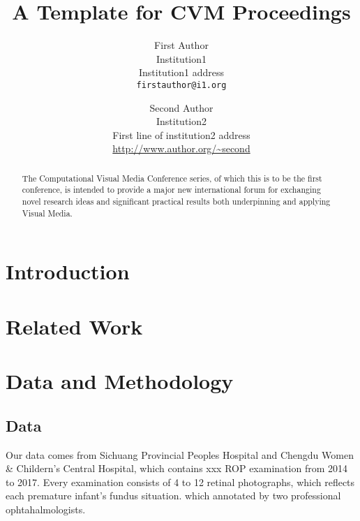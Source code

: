 \documentclass[10pt,twocolumn,letterpaper]{article}
\begin{document}
\title{A Template for CVM Proceedings}

\author{First Author\\
Institution1\\
Institution1 address\\
{\tt\small firstauthor@i1.org}
\and
Second Author\\
Institution2\\
First line of institution2 address\\
{\small\url{http://www.author.org/~second}}
}

\maketitle

\begin{abstract}
    The Computational Visual Media Conference series, of which this is to be the first conference, is intended to provide a major new international forum for exchanging novel research ideas and significant practical results both underpinning and applying Visual Media.
\end{abstract}

\section{Introduction}

\section{Related Work}

\section{Data and Methodology}
\subsection{Data}
	Our data comes from Sichuang Provincial Peoples Hospital and Chengdu Women \& Childern's Central Hospital, which contains xxx ROP examination from 2014 to 2017. Every examination consists of 4 to 12 retinal photographs, which reflects each premature infant's fundus situation.
  which annotated by two professional ophtahalmologists.
\end{document}
